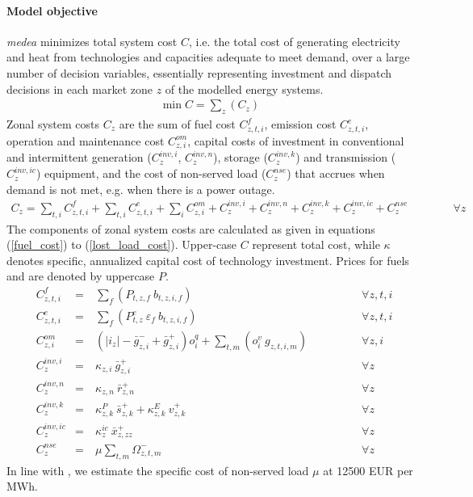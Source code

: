 \documentclass[11pt,a4paper]{article}
\begin{document}
\paragraph{Model objective}
\emph{medea} minimizes total system cost $C$, i.e. the total cost of generating electricity and heat from technologies and capacities adequate to meet demand, over a large number  of decision variables, essentially representing investment and dispatch decisions in each market zone $z$ of the modelled energy systems.
\begin{align}
\min C = \sum_{z} (C_{z})
\end{align}
Zonal system costs $C_{z}$ are the sum of fuel cost $C^{f}_{z,t,i}$, emission cost $C^{e}_{z,t,i}$, operation and maintenance cost $C^{om}_{z,i}$, capital costs of investment in conventional and intermittent generation ($C^{inv,i}_{z}$, $C^{inv,n}_{z}$), storage ($C^{inv,k}_{z}$) and transmission ($C^{inv,ic}_{z}$) equipment, and the cost of non-served load ($C^{nse}_{z}$) that accrues when demand is not met, e.g. when there is a power outage. 
\begin{align}
C_{z} = \sum_{t,i}  C^{f}_{z,t,i} + \sum_{t,i} C^{e}_{z,t,i} + \sum_{i} C^{om}_{z,i} + C^{inv,i}_{z} + 
 C^{inv,n}_{z} + C^{inv,k}_{z} + C^{inv,ic}_{z} + C^{nse}_{z} \qquad \qquad \forall z
\end{align}
The components of zonal system costs are calculated as given in equations (\ref{fuel_cost}) to (\ref{lost_load_cost}).
Upper-case $C$ represent total cost, while $\kappa$ denotes specific, annualized capital cost of technology investment. Prices for fuels and  are denoted by uppercase $P$.
\begin{align}
&C^{f}_{z,t,i}& =&\ \sum_{f} \left( P_{t,z,f} \: b_{t,z,i,f} \right) \qquad \qquad &\forall z,t,i \label{fuel_cost} \\
&C^{e}_{z,t,i}& =&\ \sum_{f} \left( P^{e}_{t,z} \: \varepsilon_{f} \: b_{t,z,i,f} \right) \qquad \qquad &\forall z,t,i\\
&C^{om}_{z,i}& =&\ \left(|i_{z}| - \bar{g}^{-}_{z,i} + \bar{g}^{+}_{z,i}\right) o^{q}_{i} + \sum_{t,m} \left(o^{v}_{i} \: g_{z,t,i,m}\right) \qquad \qquad &\forall z,i \\
&C^{inv,i}_{z}& =&\ \kappa_{z,i} \: \bar{g}^{+}_{z,i} \qquad \qquad &\forall z\\
&C^{inv,n}_{z}& =&\ \kappa_{z,n} \: \bar{r}^{+}_{z,n} \qquad \qquad &\forall z\\
&C^{inv,k}_{z}& =&\ \kappa^{P}_{z,k} \: \bar{s}^{+}_{z,k} + \kappa^{E}_{z,k} \: v^{+}_{z,k} \qquad \qquad &\forall z\\
&C^{inv,ic}_{z}& =&\ \kappa^{ic}_{z} \: \bar{x}^{+}_{z,zz} \qquad \qquad &\forall z \label{transmission_expansion_cost}\\
&C^{nse}_{z}& =&\ \mu \sum_{t,m} \Omega^{-}_{z,t,m} \qquad \qquad &\forall z \label{lost_load_cost}
\end{align}
In line with \cite{citation}, we estimate the specific cost of non-served load $\mu$ at 12500 EUR per MWh.
\end{document}
